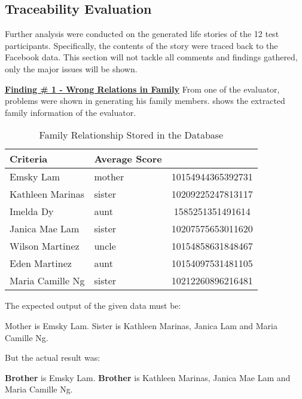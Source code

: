 \subsection{Traceability Evaluation}
Further analysis were conducted on the generated life stories of the 12 test participants. Specifically, the contents of the story were traced back to the Facebook data. This section will not tackle all comments and findings gathered, only the major issues will be shown.

\underline{\textbf{Finding \# 1 - Wrong Relations in Family}}
From one of the evaluator, problems were shown in generating his family members.  shows the extracted family information of the evaluator.

\begin{table}[ph!]   %
	\centering
	\caption{Family Relationship Stored in the Database} \vspace{0.25em}
	\begin{tabular}{|p{1in}|p{1in}|c|} \hline
		\centering Criteria & Average Score \\ \hline
		Emsky Lam & mother & 10154944365392731 \\ \hline
		Kathleen Marinas & sister & 10209225247813117 \\ \hline
		Imelda Dy & aunt & 1585251351491614 \\ \hline
		Janica Mae Lam & sister & 10207575653011620 \\ \hline
		Wilson Martinez & uncle & 10154858631848467 \\ \hline
		Eden Martinez & aunt & 10154097531481105 \\ \hline
		Maria Camille Ng & sister & 10212260896216481 \\ \hline
	\end{tabular}
	\label{tab:familyrel}
\end{table}

The expected output of the given data must be:

\begin{center}Mother is Emsky Lam. Sister is Kathleen Marinas, Janica Lam and Maria Camille Ng.\end{center}

But the actual result was:
	
\begin{center} \textbf{Brother} is Emsky Lam. \textbf{Brother} is Kathleen Marinas, Janica Mae Lam and Maria Camille Ng.\end{center}

